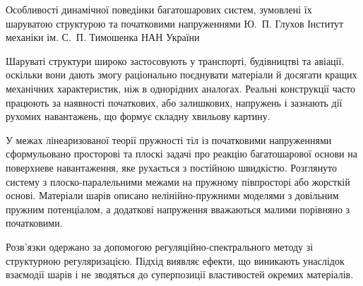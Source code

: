 \ReportHeading
  {Особливості динамічної поведінки багатошарових систем, зумовлені їх шаруватою структурою та початковими напруженнями}
  {Ю.~П. Глухов}
  {Інститут механіки ім. С.~П. Тимошенка НАН України}
  {}

Шаруваті структури широко застосовують у транспорті, будівництві та авіації, оскільки вони дають змогу раціонально поєднувати матеріали й досягати кращих механічних характеристик, ніж в однорідних аналогах. Реальні конструкції часто працюють за наявності початкових, або залишкових, напружень і зазнають дії рухомих навантажень, що формує складну хвильову картину.

У межах лінеаризованої теорії пружності тіл із початковими напруженнями сформульовано просторові та плоскі задачі про реакцію багатошарової основи на поверхневе навантаження, яке рухається з постійною швидкістю. Розглянуто систему з плоско-паралельними межами на пружному півпросторі або жорсткій основі. Матеріали шарів описано нелінійно-пружними моделями з довільним пружним потенціалом, а додаткові напруження вважаються малими порівняно з початковими.

Розв’язки одержано за допомогою регуляційно-спектрального методу зі структурною регуляризацією. Підхід виявляє ефекти, що виникають унаслідок взаємодії шарів і не зводяться до суперпозиції властивостей окремих матеріалів.

